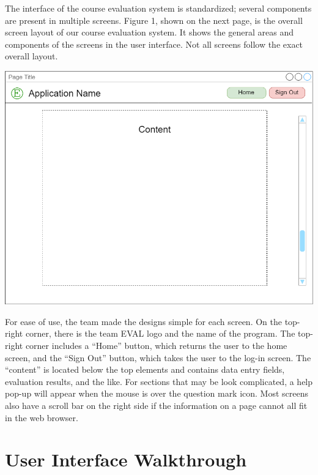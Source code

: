 \documentclass{article}
\begin{document}
The interface of the course evaluation system is standardized; several components are present in multiple screens. Figure 1, shown on the next page, is the overall screen layout of our course evaluation system. It shows the general areas and components of the screens in the user interface. Not all screens follow the exact overall layout.

\newpage

\begin{center}
\vspace{3mm}
{\includegraphics[width=6.5in]{images/overall_layout.png}}
\vspace{2mm}
\end{center}

For ease of use, the team made the designs simple for each screen. On the top-right corner, there is the team EVAL logo and the name of the program. The top-right corner includes a ``Home'' button, which returns the user to the home screen, and the ``Sign Out'' button, which takes the user to the log-in screen. The ``content'' is located below the top elements and contains data entry fields, evaluation results, and the like. For sections that may be look complicated, a help pop-up will appear when the mouse is over the question mark icon. Most screens also have a scroll bar on the right side if the information on a page cannot all fit in the web browser.

\newpage

\section{User Interface Walkthrough}
\end{document}
